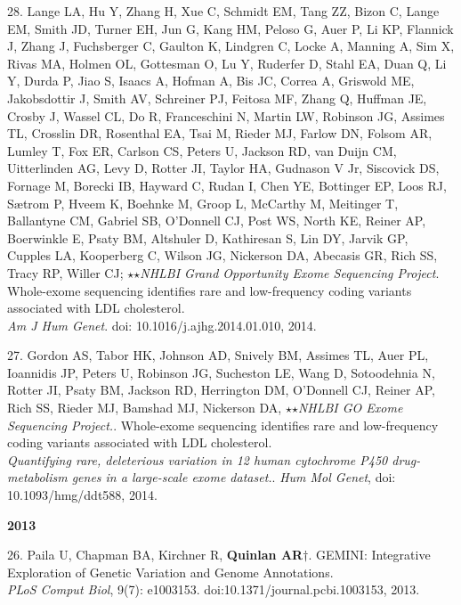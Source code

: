 \documentclass[margin,line]{cv}
\begin{document}
\begin{resume}
\begin{list}{*}{}
    \item[28.] Lange LA, Hu Y, Zhang H, Xue C, Schmidt EM, Tang ZZ, Bizon C, Lange EM, Smith JD, Turner EH, Jun G, Kang HM, Peloso G, Auer P, Li KP, Flannick J, Zhang J, Fuchsberger C, Gaulton K, Lindgren C, Locke A, Manning A, Sim X, Rivas MA, Holmen OL, Gottesman O, Lu Y, Ruderfer D, Stahl EA, Duan Q, Li Y, Durda P, Jiao S, Isaacs A, Hofman A, Bis JC, Correa A, Griswold ME, Jakobsdottir J, Smith AV, Schreiner PJ, Feitosa MF, Zhang Q, Huffman JE, Crosby J, Wassel CL, Do R, Franceschini N, Martin LW, Robinson JG, Assimes TL, Crosslin DR, Rosenthal EA, Tsai M, Rieder MJ, Farlow DN, Folsom AR, Lumley T, Fox ER, Carlson CS, Peters U, Jackson RD, van Duijn CM, Uitterlinden AG, Levy D, Rotter JI, Taylor HA, Gudnason V Jr, Siscovick DS, Fornage M, Borecki IB, Hayward C, Rudan I, Chen YE, Bottinger EP, Loos RJ, Sætrom P, Hveem K, Boehnke M, Groop L, McCarthy M, Meitinger T, Ballantyne CM, Gabriel SB, O'Donnell CJ, Post WS, North KE, Reiner AP, Boerwinkle E, Psaty BM, Altshuler D, Kathiresan S, Lin DY, Jarvik GP, Cupples LA, Kooperberg C, Wilson JG, Nickerson DA, Abecasis GR, Rich SS, Tracy RP, Willer CJ; $\star$$\star$\textit{NHLBI Grand Opportunity Exome Sequencing Project}.
    Whole-exome sequencing identifies rare and low-frequency coding variants associated with LDL cholesterol.\\
    \emph{Am J Hum Genet}. doi: 10.1016/j.ajhg.2014.01.010, 2014.

    \item[27.] Gordon AS, Tabor HK, Johnson AD, Snively BM, Assimes TL, Auer PL, Ioannidis JP, Peters U, Robinson JG, Sucheston LE, Wang D, Sotoodehnia N, Rotter JI, Psaty BM, Jackson RD, Herrington DM, O'Donnell CJ, Reiner AP, Rich SS, Rieder MJ, Bamshad MJ, Nickerson DA, $\star$$\star$\textit{NHLBI GO Exome Sequencing Project.}.
    Whole-exome sequencing identifies rare and low-frequency coding variants associated with LDL cholesterol.\\
    \emph{Quantifying rare, deleterious variation in 12 human cytochrome P450 drug-metabolism genes in a large-scale exome dataset.}. \emph{Hum Mol Genet}, doi: 10.1093/hmg/ddt588, 2014.

    \end{list}

    \textbf{2013} \\
    \begin{list}{*}{}

    \item[26.] Paila U, Chapman BA, Kirchner R, \textbf{Quinlan AR}$\dagger$.
    GEMINI: Integrative Exploration of Genetic Variation and Genome Annotations.\\
    \emph{PLoS Comput Biol}, 9(7): e1003153. doi:10.1371/journal.pcbi.1003153, 2013.


\end{list}
\end{resume}
\end{document}
